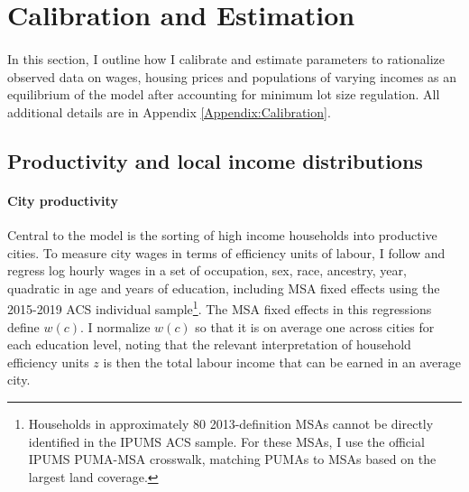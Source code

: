 \documentclass[12pt]{article}
\begin{document}

\section{Calibration and Estimation}\label{Section:CalibrationEstimation}

\paragraph{}
In this section, I outline how I calibrate and estimate parameters to rationalize observed data on wages, housing prices and populations of varying incomes as an equilibrium of the model after accounting for minimum lot size regulation. All additional details are in Appendix \ref{Appendix:Calibration}. 

\subsection{Productivity and local income distributions}

\paragraph*{City productivity} Central to the model is the sorting of high income households into productive cities. To measure city wages in terms of efficiency units of labour, I follow \cite{ineqincreased} and regress log hourly wages in a set of occupation, sex, race, ancestry, year, quadratic in age and years of education, including MSA fixed effects using the 2015-2019 ACS individual sample\footnote{Households in approximately 80 2013-definition MSAs cannot be directly identified in the IPUMS ACS sample. For these MSAs, I use the official IPUMS PUMA-MSA crosswalk, matching PUMAs to MSAs based on the largest land coverage.}. The MSA fixed effects in this regressions define $w(c)$. I normalize $w(c)$ so that it is on average one across cities for each education level, noting that the relevant interpretation of household efficiency units $z$ is then the total labour income that can be earned in an average city. 
\end{document}
